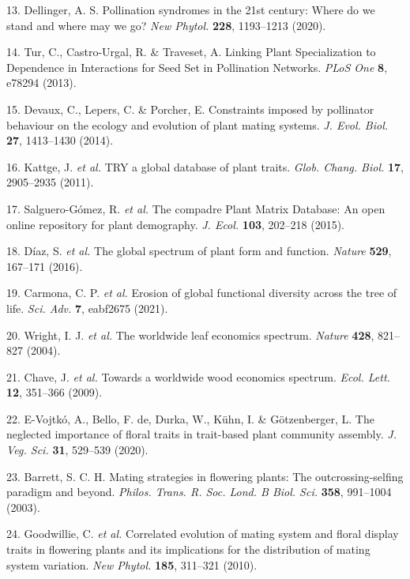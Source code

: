 \documentclass[12pt,a4paper,]{article}
\begin{document}
\hypertarget{ref-dellinger2020}{}
13. Dellinger, A. S. Pollination syndromes in the 21st century: Where do
we stand and where may we go? \emph{New Phytol.} \textbf{228},
1193--1213 (2020).

\hypertarget{ref-tur2013}{}
14. Tur, C., Castro-Urgal, R. \& Traveset, A. Linking Plant
Specialization to Dependence in Interactions for Seed Set in Pollination
Networks. \emph{PLoS One} \textbf{8}, e78294 (2013).

\hypertarget{ref-devaux2014}{}
15. Devaux, C., Lepers, C. \& Porcher, E. Constraints imposed by
pollinator behaviour on the ecology and evolution of plant mating
systems. \emph{J. Evol. Biol.} \textbf{27}, 1413--1430 (2014).

\hypertarget{ref-kattge2011}{}
16. Kattge, J. \emph{et al.} TRY a global database of plant traits.
\emph{Glob. Chang. Biol.} \textbf{17}, 2905--2935 (2011).

\hypertarget{ref-salguero2015}{}
17. Salguero-Gómez, R. \emph{et al.} The compadre Plant Matrix Database:
An open online repository for plant demography. \emph{J. Ecol.}
\textbf{103}, 202--218 (2015).

\hypertarget{ref-diaz2016}{}
18. Díaz, S. \emph{et al.} The global spectrum of plant form and
function. \emph{Nature} \textbf{529}, 167--171 (2016).

\hypertarget{ref-carmona2021}{}
19. Carmona, C. P. \emph{et al.} Erosion of global functional diversity
across the tree of life. \emph{Sci. Adv.} \textbf{7}, eabf2675 (2021).

\hypertarget{ref-wright2004}{}
20. Wright, I. J. \emph{et al.} The worldwide leaf economics spectrum.
\emph{Nature} \textbf{428}, 821--827 (2004).

\hypertarget{ref-chave2009}{}
21. Chave, J. \emph{et al.} Towards a worldwide wood economics spectrum.
\emph{Ecol. Lett.} \textbf{12}, 351--366 (2009).

\hypertarget{ref-evojtko2020}{}
22. E-Vojtkó, A., Bello, F. de, Durka, W., Kühn, I. \& Götzenberger, L.
The neglected importance of floral traits in trait-based plant community
assembly. \emph{J. Veg. Sci.} \textbf{31}, 529--539 (2020).

\hypertarget{ref-barrett2003}{}
23. Barrett, S. C. H. Mating strategies in flowering plants: The
outcrossing-selfing paradigm and beyond. \emph{Philos. Trans. R. Soc.
Lond. B Biol. Sci.} \textbf{358}, 991--1004 (2003).

\hypertarget{ref-goodwillie2010}{}
24. Goodwillie, C. \emph{et al.} Correlated evolution of mating system
and floral display traits in flowering plants and its implications for
the distribution of mating system variation. \emph{New Phytol.}
\textbf{185}, 311--321 (2010).
\end{document}
